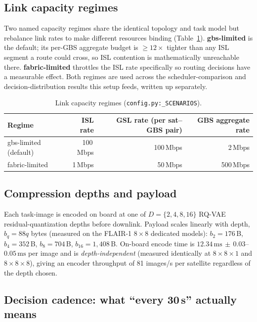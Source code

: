 \subsection{Link capacity regimes}

Two named capacity regimes share the identical topology and task model but
rebalance link rates to make different resources binding
(Table~\ref{tab:regimes}). \textbf{gbs-limited} is the default; its per-GBS
aggregate budget is $\ge 12\times$ tighter than any ISL segment a route
could cross, so ISL contention is mathematically unreachable there.
\textbf{fabric-limited} throttles the ISL rate specifically so routing
decisions have a measurable effect. Both regimes are used across the
scheduler-comparison and decision-distribution results this setup feeds,
written up separately.

\begin{table}[h]
\centering
\caption{Link capacity regimes (\texttt{config.py:\_SCENARIOS}).}
\label{tab:regimes}
\begin{tabular}{lrrr}
\toprule
Regime & ISL rate & GSL rate (per sat--GBS pair) & GBS aggregate rate \\
\midrule
gbs-limited (default) & 100\,Mbps & 100\,Mbps & 2\,Mbps \\
fabric-limited         & 1\,Mbps   & 50\,Mbps  & 500\,Mbps \\
\bottomrule
\end{tabular}
\end{table}

\subsection{Compression depths and payload}

Each task-image is encoded on board at one of $D = \{2, 4, 8, 16\}$
RQ-VAE residual-quantization depths before downlink. Payload scales linearly
with depth, $b_q = 88q$ bytes (measured on the FLAIR-1 $8{\times}8$ dedicated
models): $b_2 = 176$\,B, $b_4 = 352$\,B,
$b_8 = 704$\,B, $b_{16} = 1{,}408$\,B. On-board encode time is
$12.34\,\text{ms}\,\pm\,0.03$--$0.05\,\text{ms}$ per image and is
\emph{depth-independent} (measured identically at $8{\times}8{\times}1$ and
$8{\times}8{\times}8$), giving an encoder throughput of 81 images/s per
satellite regardless of the depth chosen.

\subsection{Decision cadence: what ``every 30\,s'' actually means}

